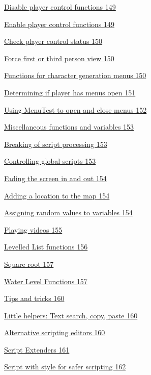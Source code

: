 \documentclass[
]{article}
\begin{document}
\protect\hyperlink{disable-player-control-functions}{Disable player
control functions 149}

\protect\hyperlink{enable-player-control-functions}{Enable player
control functions 149}

\protect\hyperlink{check-player-control-status}{Check player control
status 150}

\protect\hyperlink{force-first-or-third-person-view}{Force first or
third person view 150}

\protect\hyperlink{functions-for-character-generation-menus}{Functions
for character generation menus 150}

\protect\hyperlink{determining-if-player-has-menus-open}{Determining if
player has menus open 151}

\protect\hyperlink{using-menutest-to-open-and-close-menus}{Using
MenuTest to open and close menus 152}

\protect\hyperlink{miscellaneous-functions-and-variables}{Miscellaneous
functions and variables 153}

\protect\hyperlink{breaking-of-script-processing}{Breaking of script
processing 153}

\protect\hyperlink{controlling-global-scripts}{Controlling global
scripts 153}

\protect\hyperlink{fading-the-screen-in-and-out}{Fading the screen in
and out 154}

\protect\hyperlink{adding-a-location-to-the-map}{Adding a location to
the map 154}

\protect\hyperlink{assigning-random-values-to-variables}{Assigning
random values to variables 154}

\protect\hyperlink{playing-videos}{Playing videos 155}

\protect\hyperlink{_Toc182634660}{Levelled List functions 156}

\protect\hyperlink{square-root}{Square root 157}

\protect\hyperlink{water-level-functions}{Water Level Functions 157}

\protect\hyperlink{tips-and-tricks}{Tips and tricks 160}

\protect\hyperlink{little-helpers-text-search-copy-paste}{Little
helpers: Text search, copy, paste 160}

\protect\hyperlink{alternative-scripting-editors}{Alternative scripting
editors 160}

\protect\hyperlink{script-extenders}{Script Extenders 161}

\protect\hyperlink{script-with-style-for-safer-scripting}{Script with
style for safer scripting 162}
\end{document}
